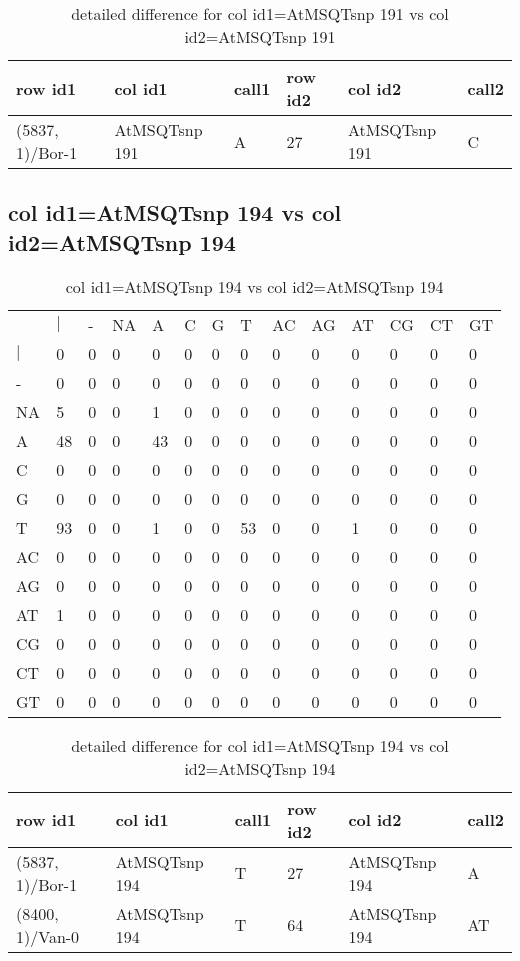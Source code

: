\begin{center}
\begin{longtable}{|l|l|l|l|l|l|}
\caption{detailed difference for col id1=AtMSQTsnp 191 vs col id2=AtMSQTsnp 191} \label{table_dm571}\\
\hline
row id1&col id1&call1&row id2&col id2&call2\\
\hline
(5837, 1)/Bor-1&AtMSQTsnp 191&A&27&AtMSQTsnp 191&C\\
\hline
\end{longtable}
\end{center}

\subsection{col id1=AtMSQTsnp 194 vs col id2=AtMSQTsnp 194}
\begin{center}
\begin{longtable}{|l|l|l|l|l|l|l|l|l|l|l|l|l|l|}
\caption{col id1=AtMSQTsnp 194 vs col id2=AtMSQTsnp 194} \label{table_dm572}\\
\hline
\\
\hline
&$|$&-&NA&A&C&G&T&AC&AG&AT&CG&CT&GT\\
$|$&0&0&0&0&0&0&0&0&0&0&0&0&0\\
-&0&0&0&0&0&0&0&0&0&0&0&0&0\\
NA&5&0&0&1&0&0&0&0&0&0&0&0&0\\
A&48&0&0&43&0&0&0&0&0&0&0&0&0\\
C&0&0&0&0&0&0&0&0&0&0&0&0&0\\
G&0&0&0&0&0&0&0&0&0&0&0&0&0\\
T&93&0&0&1&0&0&53&0&0&1&0&0&0\\
AC&0&0&0&0&0&0&0&0&0&0&0&0&0\\
AG&0&0&0&0&0&0&0&0&0&0&0&0&0\\
AT&1&0&0&0&0&0&0&0&0&0&0&0&0\\
CG&0&0&0&0&0&0&0&0&0&0&0&0&0\\
CT&0&0&0&0&0&0&0&0&0&0&0&0&0\\
GT&0&0&0&0&0&0&0&0&0&0&0&0&0\\
\hline
\end{longtable}
\end{center}

\begin{center}
\begin{longtable}{|l|l|l|l|l|l|}
\caption{detailed difference for col id1=AtMSQTsnp 194 vs col id2=AtMSQTsnp 194} \label{table_dm573}\\
\hline
row id1&col id1&call1&row id2&col id2&call2\\
\hline
(5837, 1)/Bor-1&AtMSQTsnp 194&T&27&AtMSQTsnp 194&A\\
(8400, 1)/Van-0&AtMSQTsnp 194&T&64&AtMSQTsnp 194&AT\\
\hline
\end{longtable}
\end{center}

